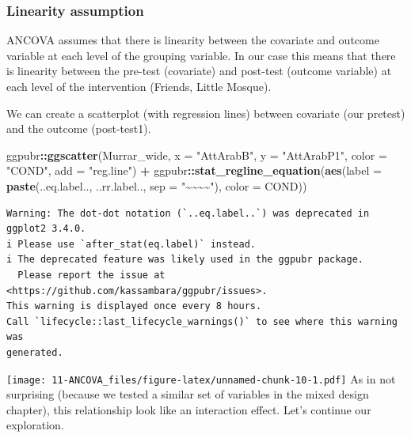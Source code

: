 \documentclass[
  11pt,
]{book}
\newenvironment{Shaded}{\begin{snugshade}}{\end{snugshade}}
\newcommand{\AttributeTok}[1]{\textcolor[rgb]{0.27,0.27,0.27}{#1}}
\newcommand{\FunctionTok}[1]{\textcolor[rgb]{0.27,0.27,0.27}{\textbf{#1}}}
\newcommand{\NormalTok}[1]{#1}
\newcommand{\SpecialCharTok}[1]{\textcolor[rgb]{0.43,0.43,0.43}{\textbf{#1}}}
\newcommand{\StringTok}[1]{\textcolor[rgb]{0.5,0.5,0.5}{#1}}
\begin{document}
\hypertarget{linearity-assumption}{%
\subsubsection{Linearity assumption}\label{linearity-assumption}}

ANCOVA assumes that there is linearity between the covariate and outcome variable at each level of the grouping variable. In our case this means that there is linearity between the pre-test (covariate) and post-test (outcome variable) at each level of the intervention (Friends, Little Mosque).

We can create a scatterplot (with regression lines) between covariate (our pretest) and the outcome (post-test1).

\begin{Shaded}
\begin{Highlighting}[]
\NormalTok{ggpubr}\SpecialCharTok{::}\FunctionTok{ggscatter}\NormalTok{(Murrar\_wide, }\AttributeTok{x =} \StringTok{"AttArabB"}\NormalTok{, }\AttributeTok{y =} \StringTok{"AttArabP1"}\NormalTok{, }\AttributeTok{color =} \StringTok{"COND"}\NormalTok{,}
    \AttributeTok{add =} \StringTok{"reg.line"}\NormalTok{) }\SpecialCharTok{+}\NormalTok{ ggpubr}\SpecialCharTok{::}\FunctionTok{stat\_regline\_equation}\NormalTok{(}\FunctionTok{aes}\NormalTok{(}\AttributeTok{label =} \FunctionTok{paste}\NormalTok{(..eq.label..,}
\NormalTok{    ..rr.label.., }\AttributeTok{sep =} \StringTok{"\textasciitilde{}\textasciitilde{}\textasciitilde{}\textasciitilde{}"}\NormalTok{), }\AttributeTok{color =}\NormalTok{ COND))}
\end{Highlighting}
\end{Shaded}

\begin{verbatim}
Warning: The dot-dot notation (`..eq.label..`) was deprecated in ggplot2 3.4.0.
i Please use `after_stat(eq.label)` instead.
i The deprecated feature was likely used in the ggpubr package.
  Please report the issue at <https://github.com/kassambara/ggpubr/issues>.
This warning is displayed once every 8 hours.
Call `lifecycle::last_lifecycle_warnings()` to see where this warning was
generated.
\end{verbatim}

\texttt{[image: 11-ANCOVA\_files/figure-latex/unnamed-chunk-10-1.pdf]} As in not surprising (because we tested a similar set of variables in the mixed design chapter), this relationship look like an interaction effect. Let's continue our exploration.
\end{document}
